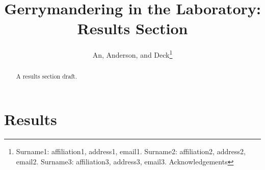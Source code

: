 \documentclass[AER]{AEA}
\begin{document}
\title{Gerrymandering in the Laboratory: Results Section}
\author{An,  Anderson, and Deck\thanks{Surname1: affiliation1, address1, email1. 
Surname2: affiliation2, address2, email2. Surname3: affiliation3, address3, email3. Acknowledgements}}

\begin{abstract}
A results section draft.
\end{abstract}


\maketitle

%
%
%
%
%
%
%
%
%
%

\section{Results}
\end{document}
